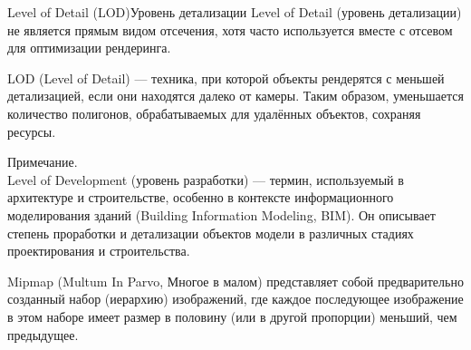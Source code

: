\documentclass{beamer}
\begin{document}
	\begin{frame}{Level of Detail (LOD)}{Уровень детализации}
		Level of Detail (уровень детализации) не является прямым видом отсечения, хотя часто используется вместе с отсевом для оптимизации рендеринга. 

		LOD (Level of Detail) --- техника, при которой объекты рендерятся с меньшей детализацией, если они находятся далеко от камеры. Таким образом, уменьшается количество полигонов, обрабатываемых для удалённых объектов, сохраняя ресурсы.

		{ \footnotesize

		Примечание. \\
		Level of Development (уровень разработки) --- термин, используемый в архитектуре и строительстве, особенно в контексте информационного моделирования зданий (Building Information Modeling, BIM). Он описывает степень проработки и детализации объектов модели в различных стадиях проектирования и строительства.

		Mipmap (Multum In Parvo, Многое в малом) представляет собой предварительно созданный набор (иерархию) изображений, где каждое последующее изображение в этом наборе имеет размер в половину (или в другой пропорции) меньший, чем предыдущее.
		
		\\

		}

	\end{frame}
\end{document}

